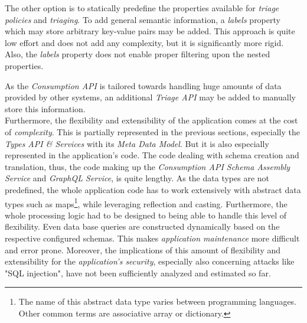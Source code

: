 The other option is to statically predefine the properties available for \emph{triage policies} and \emph{triaging}. To add general semantic information, a \emph{labels} property which may store arbitrary key-value pairs may be added. This approach is quite low effort and does not add any complexity, but it is significantly more rigid. Also, the \emph{labels} property does not enable proper filtering upon the nested properties.\par
As the \emph{Consumption API} is tailored towards handling huge amounts of data provided by other systems, an additional \emph{Triage API} may be added to manually store this information.\\

Furthermore, the flexibility and extensibility of the application comes at the cost of \emph{complexity}. This is partially represented in the previous sections, especially the \emph{Types API \& Services} with its \emph{Meta Data Model}. But it is also especially represented in the application's code. The code dealing with schema creation and translation, thus, the code making up the \emph{Consumption API Schema Assembly Service} and \emph{GraphQL Service}, is quite lengthy. As the data types are not predefined, the whole application code has to work extensively with abstract data types such as maps\footnote{The name of this abstract data type varies between programming languages. Other common terms are associative array or dictionary.}, while leveraging reflection and casting. Furthermore, the whole processing logic had to be designed to being able to handle this level of flexibility. Even data base queries are constructed dynamically based on the respective configured schemas. This makes \emph{application maintenance} more difficult and error prone. Moreover, the implications of this amount of flexibility and extensibility for the \emph{application's security}, especially also concerning attacks like "SQL injection", have not been sufficiently analyzed and estimated so far. 
